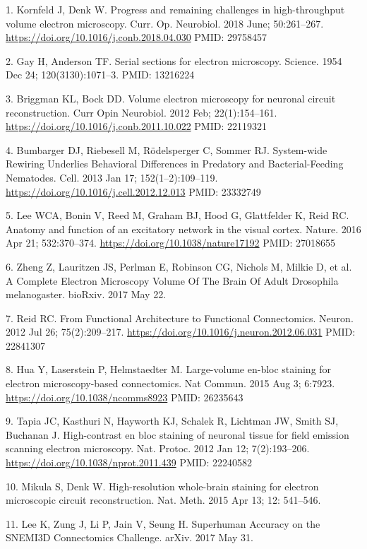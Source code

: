 \documentclass{article}
\begin{document}
\begin{hangpars}\small
1. Kornfeld J, Denk W. Progress and remaining challenges in high-throughput volume electron microscopy. Curr. Op. Neurobiol. 2018 June; 50:261–267. \url{https://doi.org/10.1016/j.conb.2018.04.030} PMID: 29758457

2. Gay H, Anderson TF. Serial sections for electron microscopy. Science. 1954 Dec 24; 120(3130):1071–3. PMID: 13216224

3. Briggman KL, Bock DD. Volume electron microscopy for neuronal circuit reconstruction. Curr Opin Neurobiol. 2012 Feb; 22(1):154–161. \url{https://doi.org/10.1016/j.conb.2011.10.022} PMID: 22119321

4. Bumbarger DJ, Riebesell M, Rödelsperger C, Sommer RJ. System-wide Rewiring Underlies Behavioral Differences in Predatory and Bacterial-Feeding Nematodes. Cell. 2013 Jan 17; 152(1–2):109–119. \url{https://doi.org/10.1016/j.cell.2012.12.013} PMID: 23332749

5. Lee WCA, Bonin V, Reed M, Graham BJ, Hood G, Glattfelder K, Reid RC. Anatomy and function of an excitatory network in the visual cortex. Nature. 2016 Apr 21; 532:370–374. \url{https://doi.org/10.1038/nature17192} PMID: 27018655

6. Zheng Z, Lauritzen JS, Perlman E, Robinson CG, Nichols M, Milkie D, et al. A Complete Electron Microscopy Volume Of The Brain Of Adult Drosophila melanogaster. bioRxiv. 2017 May 22.

7. Reid RC. From Functional Architecture to Functional Connectomics. Neuron. 2012 Jul 26; 75(2):209–217. \url{https://doi.org/10.1016/j.neuron.2012.06.031} PMID: 22841307

8. Hua Y, Laserstein P, Helmstaedter M. Large-volume en-bloc staining for electron microscopy-based connectomics. Nat Commun. 2015 Aug 3; 6:7923. \url{https://doi.org/10.1038/ncomms8923} PMID: 26235643

9. Tapia JC, Kasthuri N, Hayworth KJ, Schalek R, Lichtman JW, Smith SJ, Buchanan J. High-contrast en bloc staining of neuronal tissue for field emission scanning electron microscopy. Nat. Protoc. 2012 Jan 12; 7(2):193–206. \url{https://doi.org/10.1038/nprot.2011.439} PMID: 22240582

10. Mikula S, Denk W. High-resolution whole-brain staining for electron microscopic circuit reconstruction. Nat. Meth. 2015 Apr 13; 12: 541–546.

11. Lee K, Zung J, Li P, Jain V, Seung H. Superhuman Accuracy on the SNEMI3D Connectomics Challenge. arXiv. 2017 May 31.


\end{hangpars}
\end{document}

